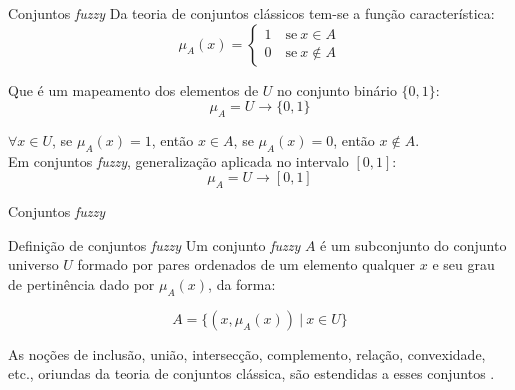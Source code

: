 \begin{frame}{Conjuntos \emph{fuzzy}}
Da teoria de conjuntos clássicos tem-se a função característica:
\begin{equation*}
  \mu_A(x) =  \begin{cases}
                1 \quad \text{se}\ x \in A \\
                0 \quad \text{se}\ x \notin A
              \end{cases}
\end{equation*}

Que é um mapeamento dos elementos de $U$ no conjunto binário $\{0, 1\}$:
\begin{equation*}
  \mu_A =  U \rightarrow \{0, 1\}
\end{equation*}

$\forall x \in U$, se $\mu_A(x) = 1$, então $x \in A$, se $\mu_A(x) = 0$, então $x \notin A$.\\[8pt]

Em conjuntos \emph{fuzzy}, generalização aplicada no intervalo $[0, 1]$:
\begin{equation*}
  \mu_A =  U \rightarrow [0, 1]
\end{equation*}
\end{frame}

\begin{frame}{Conjuntos \emph{fuzzy}}

\begin{block}{Definição de conjuntos \emph{fuzzy}}
Um conjunto \emph{fuzzy} $A$ é um subconjunto do conjunto universo $U$ formado por pares ordenados de um elemento qualquer $x$ e seu grau de pertinência dado por $\mu_A(x)$, da forma:

\begin{equation*}
  A =  \{(x, \mu_A(x)) \ |\ x \in U\}
\end{equation*}
\end{block}

As noções de inclusão, união, intersecção, complemento, relação, convexidade, etc., oriundas da teoria de conjuntos clássica, são estendidas a esses conjuntos \citep{zadeh:65}.

\end{frame}

